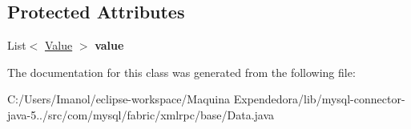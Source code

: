 \subsection*{Protected Attributes}
\begin{DoxyCompactItemize}
\item 
\mbox{\label{classcom_1_1mysql_1_1fabric_1_1xmlrpc_1_1base_1_1_data_a6dae8fde7df87ad014d6426aceecdd98}} 
List$<$ \mbox{\hyperlink{classcom_1_1mysql_1_1fabric_1_1xmlrpc_1_1base_1_1_value}{Value}} $>$ {\bfseries value}
\end{DoxyCompactItemize}


The documentation for this class was generated from the following file\+:\begin{DoxyCompactItemize}
\item 
C\+:/\+Users/\+Imanol/eclipse-\/workspace/\+Maquina Expendedora/lib/mysql-\/connector-\/java-\/5../src/com/mysql/fabric/xmlrpc/base/Data.\+java\end{DoxyCompactItemize}
